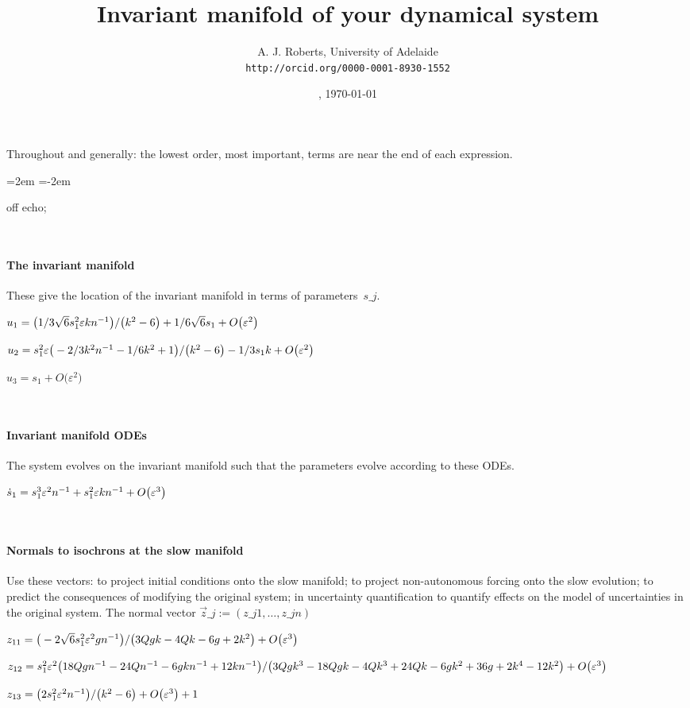 \documentclass[11pt,a5paper]{article}
\title{Invariant manifold of your dynamical system}
\author{A. J. Roberts, University of Adelaide\\
\texttt{http://orcid.org/0000-0001-8930-1552}}
\date{\now, \today}
\begin{document}
\maketitle
Throughout and generally: the lowest order, most
important, terms are near the end of each expression.
\par\leftskip=2em  \parindent=-2em


off echo;

\(
\)
\paragraph{The invariant manifold}
These give the location of the invariant manifold in
terms of parameters~\(s\_ j\).
\(
\)\par
\(u_{1}=\big(1/3 \sqrt {6} s_{1}^{2} \varepsilon k n^{-1}\big)/\big(k^{2}-6\big)+
1/6 \sqrt {6} s_{1}+O\big(\varepsilon ^{2}\big)
\)\par
\(u_{2}=s_{1}^{2} \varepsilon \big(-2/3 k^{2} n^{-1}-1/6 k^{2}+1\big)/\big(k^{2}-
6\big)-1/3 s_{1} k+O\big(\varepsilon ^{2}\big)
\)\par
\(u_{3}=s_{1}+O\big(\varepsilon ^{2}\big)
\)\par
\(
\)
\paragraph{Invariant manifold ODEs}
The system evolves on the invariant manifold such
that the parameters evolve according to these ODEs.
\(
\)\par
\(\dot s_{1}=s_{1}^{3} \varepsilon^{2} n^{-1}+s_{1}^{2} \varepsilon k n^{-1}+O\big(
\varepsilon ^{3}\big)
\)\par
\(
\)
\paragraph{Normals to isochrons at the slow manifold}
Use these vectors: to project initial conditions
onto the slow manifold; to project non-autonomous
forcing onto the slow evolution; to predict the
consequences of modifying the original system; in
uncertainty quantification to quantify effects on
the model of uncertainties in the original system.
The normal vector \(\vec z\_j:=(z\_{j1},\ldots,z\_{jn})\)
\(
\)\par
\(z_{11}=\big(-2 \sqrt {6} s_{1}^{2} \varepsilon^{2} g n^{-1}\big)/\big(3 Q g k-4
 Q k-6 g+2 k^{2}\big)+O\big(\varepsilon ^{3}\big)
\)\par
\(z_{12}=s_{1}^{2} \varepsilon^{2} \big(18 Q g n^{-1}-24 Q n^{-1}-6 g k n^{-1}+12
 k n^{-1}\big)/\big(3 Q g k^{3}-18 Q g k-4 Q k^{3}+24 Q k-6 g k^{2}+36 g
+2 k^{4}-12 k^{2}\big)+O\big(\varepsilon ^{3}\big)
\)\par
\(z_{13}=\big(2 s_{1}^{2} \varepsilon^{2} n^{-1}\big)/\big(k^{2}-6\big)+O\big(
\varepsilon ^{3}\big)+1
\)\par
\(
\)\par
\end{document}
